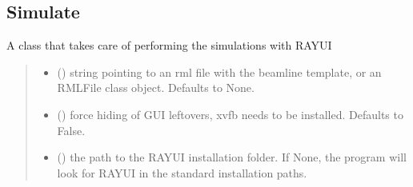 \documentclass[letterpaper,10pt,english]{sphinxmanual}
\begin{document}
\subsection{Simulate}
\label{\detokenize{API:simulate}}

\begin{fulllineitems}
\label{\detokenize{API:raypyng.simulate.Simulate}}
\pysigstartsignatures
{}
\pysigstopsignatures
\sphinxAtStartPar
A class that takes care of performing the simulations with RAY\sphinxhyphen{}UI
\begin{quote}\begin{description}
\begin{itemize}
\item {} 
\sphinxAtStartPar
{} (\sphinxstyleliteralemphasis{\sphinxupquote{, }}) \textendash{} string pointing to an rml file with
the beamline template, or an RMLFile
class object. Defaults to None.

\item {} 
\sphinxAtStartPar
{} (\sphinxstyleliteralemphasis{\sphinxupquote{, }}) \textendash{} force hiding of GUI leftovers, xvfb needs
to be installed. Defaults to False.

\item {} 
\sphinxAtStartPar
{} (\sphinxstyleliteralemphasis{\sphinxupquote{, }}) \textendash{} the path to the RAY\sphinxhyphen{}UI installation folder.
If None, the program will look for RAY\sphinxhyphen{}UI in
the standard installation paths.

\end{itemize}


\end{description}
\end{quote}
\end{fulllineitems}
\end{document}
